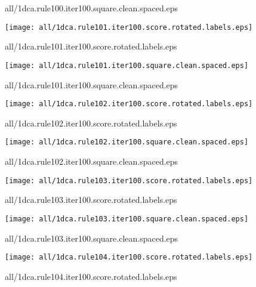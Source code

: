 \documentclass{article}
\begin{document}
{\footnotesize all/1dca.rule100.iter100.square.clean.spaced.eps}
\begin{center}
\begin{minipage}{\textwidth}
\texttt{[image: all/1dca.rule101.iter100.score.rotated.labels.eps]}
\end{minipage}
\end{center}
{\footnotesize all/1dca.rule101.iter100.score.rotated.labels.eps}
\begin{center}
\begin{minipage}{\textwidth}
\texttt{[image: all/1dca.rule101.iter100.square.clean.spaced.eps]}
\end{minipage}
\end{center}
{\footnotesize all/1dca.rule101.iter100.square.clean.spaced.eps}
\begin{center}
\begin{minipage}{\textwidth}
\texttt{[image: all/1dca.rule102.iter100.score.rotated.labels.eps]}
\end{minipage}
\end{center}
{\footnotesize all/1dca.rule102.iter100.score.rotated.labels.eps}
\begin{center}
\begin{minipage}{\textwidth}
\texttt{[image: all/1dca.rule102.iter100.square.clean.spaced.eps]}
\end{minipage}
\end{center}
{\footnotesize all/1dca.rule102.iter100.square.clean.spaced.eps}
\begin{center}
\begin{minipage}{\textwidth}
\texttt{[image: all/1dca.rule103.iter100.score.rotated.labels.eps]}
\end{minipage}
\end{center}
{\footnotesize all/1dca.rule103.iter100.score.rotated.labels.eps}
\begin{center}
\begin{minipage}{\textwidth}
\texttt{[image: all/1dca.rule103.iter100.square.clean.spaced.eps]}
\end{minipage}
\end{center}
{\footnotesize all/1dca.rule103.iter100.square.clean.spaced.eps}
\begin{center}
\begin{minipage}{\textwidth}
\texttt{[image: all/1dca.rule104.iter100.score.rotated.labels.eps]}
\end{minipage}
\end{center}
{\footnotesize all/1dca.rule104.iter100.score.rotated.labels.eps}
\end{document}
